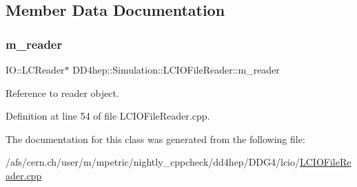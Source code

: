 \subsection{Member Data Documentation}
\hypertarget{class_d_d4hep_1_1_simulation_1_1_l_c_i_o_file_reader_a11b157abd2a7ac565d63d82158974ad7}{}\label{class_d_d4hep_1_1_simulation_1_1_l_c_i_o_file_reader_a11b157abd2a7ac565d63d82158974ad7} 
\subsubsection{\texorpdfstring{m\+\_\+reader}{m\_reader}}
{\footnotesize\ttfamily I\+O\+::\+L\+C\+Reader$\ast$ D\+D4hep\+::\+Simulation\+::\+L\+C\+I\+O\+File\+Reader\+::m\+\_\+reader\hspace{0.3cm}{\ttfamily [protected]}}



Reference to reader object. 



Definition at line 54 of file L\+C\+I\+O\+File\+Reader.\+cpp.



The documentation for this class was generated from the following file\+:\begin{DoxyCompactItemize}
\item 
/afs/cern.\+ch/user/m/mpetric/nightly\+\_\+cppcheck/dd4hep/\+D\+D\+G4/lcio/\hyperlink{_l_c_i_o_file_reader_8cpp}{L\+C\+I\+O\+File\+Reader.\+cpp}\end{DoxyCompactItemize}
